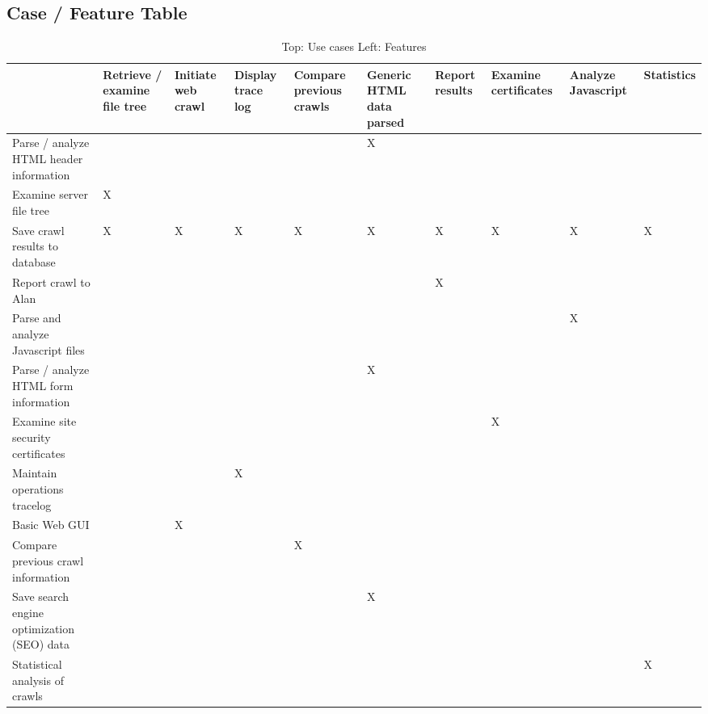 \newpage

\begin{landscape}


\begin{table}
\section{Case / Feature Table}
\begin{centering}

\begin{tabular}{|p{1.5in}*{8}{|p{.65in}}|l|}
	\hline
	 & Retrieve / examine file tree & %
	Initiate web crawl & %
	Display trace log & %
	Compare previous crawls & %
	Generic HTML data parsed & %
	Report results & %
	Examine certificates & %
	Analyze Javascript & %
	Statistics \\ \hline	
	Parse / analyze HTML header information & & & & &X& & & &  \\ \hline
	Examine server file tree &X& & & & & & & &  \\ \hline
	Save crawl results to database & X&X &X &X &X&X &X &X & X  \\ \hline
	Report crawl to Alan & & & & & &X& & &  \\ \hline
	Parse and analyze Javascript files & & & & & & & &X&  \\ \hline
	Parse / analyze HTML form information & & & & & X& & & &  \\ \hline
	Examine site security certificates & & & & & & &X& &  \\ \hline
	Maintain operations tracelog & & &X& & & & & &  \\ \hline
	Basic Web GUI & &X& & & & & & &  \\ \hline
	Compare previous crawl information & & & &X& & & & &  \\ \hline
	Save search engine optimization (SEO) data & & & & &X& & & &  \\ \hline
	Statistical analysis of crawls & & & & & & & & &X \\ \hline 
\end{tabular}
\end{centering}
\caption{Top: Use cases Left: Features}
\end{table}
\end{landscape}
